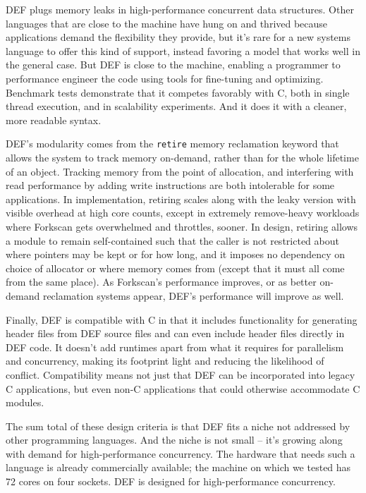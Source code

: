 DEF plugs memory leaks in high-performance concurrent data structures.  Other languages that are close to the machine have hung on and thrived because applications demand the flexibility they provide, but it's rare for a new systems language to offer this kind of support, instead favoring a model that works well in the general case.  But DEF is close to the machine, enabling a programmer to performance engineer the code using tools for fine-tuning and optimizing.  Benchmark tests demonstrate that it competes favorably with C, both in single thread execution, and in scalability experiments.  And it does it with a cleaner, more readable syntax.

DEF's modularity comes from the \texttt{retire} memory reclamation keyword that allows the system to track memory on-demand, rather than for the whole lifetime of an object.  Tracking memory from the point of allocation, and interfering with read performance by adding write instructions are both intolerable for some applications.  In implementation, retiring scales along with the leaky version with visible overhead at high core counts, except in extremely remove-heavy workloads where Forkscan gets overwhelmed and throttles, sooner.  In design, retiring allows a module to remain self-contained such that the caller is not restricted about where pointers may be kept or for how long, and it imposes no dependency on choice of allocator or where memory comes from (except that it must all come from the same place).  As Forkscan's performance improves, or as better on-demand reclamation systems appear, DEF's performance will improve as well.

Finally, DEF is compatible with C in that it includes functionality for generating header files from DEF source files and can even include header files directly in DEF code.  It doesn't add runtimes apart from what it requires for parallelism and concurrency, making its footprint light and reducing the likelihood of conflict.  Compatibility means not just that DEF can be incorporated into legacy C applications, but even non-C applications that could otherwise accommodate C modules.

The sum total of these design criteria is that DEF fits a niche not addressed by other programming languages.  And the niche is not small -- it's growing along with demand for high-performance concurrency.  The hardware that needs such a language is already commercially available; the machine on which we tested has 72 cores on four sockets.  DEF is designed for high-performance concurrency.

